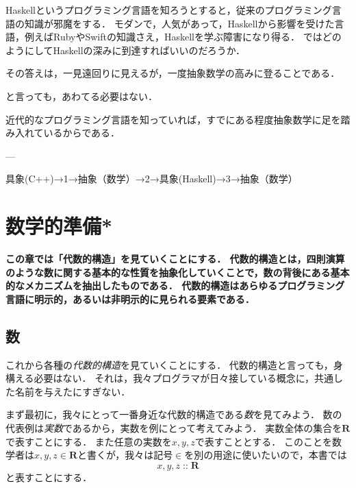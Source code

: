 \documentclass[twocolumn]{jsbook}
\newcommand{\keyword}[1]{\emph{#1}}
\newenvironment{leader}{\begingroup\bf}{\endgroup}
\DeclareMathOperator{\mathIn}{::}
\newcommand{\mathSet}[1]{\mathbf{#1}}
\begin{document}
Haskellというプログラミング言語を知ろうとすると，従来のプログラミング言語の知識が邪魔をする．
モダンで，人気があって，Haskellから影響を受けた言語，例えばRubyやSwiftの知識さえ，Haskellを学ぶ障害になり得る．
ではどのようにしてHaskellの深みに到達すればいいのだろうか．

その答えは，一見遠回りに見えるが，一度抽象数学の高みに登ることである．

と言っても，あわてる必要はない．

近代的なプログラミング言語を知っていれば，すでにある程度抽象数学に足を踏み入れているからである．

---

具象(C++)→1→抽象（数学）→2→具象(Haskell)→3→抽象（数学）

\chapter{数学的準備*}

\begin{leader}
この章では「代数的構造」を見ていくことにする．
代数的構造とは，四則演算のような数に関する基本的な性質を抽象化していくことで，数の背後にある基本的なメカニズムを抽出したものである．
代数的構造はあらゆるプログラミング言語に明示的，あるいは非明示的に見られる要素である．
\end{leader}

\section{数}

これから各種の\keyword{代数的構造}を見ていくことにする．
代数的構造と言っても，身構える必要はない．
それは，我々プログラマが日々接している概念に，共通した名前を与えたにすぎない．

まず最初に，我々にとって一番身近な代数的構造である\keyword{数}を見てみよう．
数の代表例は\keyword{実数}であるから，実数を例にとって考えてみよう．
実数全体の集合を$\mathSet{R}$で表すことにする．
また任意の実数を$x,y,z$で表すこととする．
このことを数学者は$x,y,z\in\mathSet{R}$と書くが，我々は記号$\in$を別の用途に使いたいので，本書では$$x,y,z\mathIn\mathSet{R}$$と表すことにする．
\end{document}
